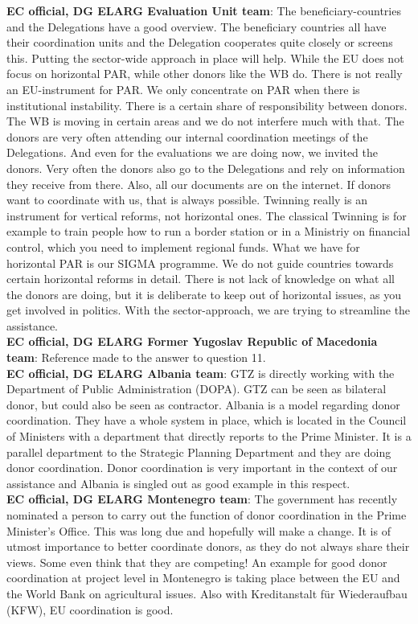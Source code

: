 \textbf{EC official, DG ELARG Evaluation Unit team}: The beneficiary-countries and the Delegations have a good overview. The beneficiary countries all have their coordination units and the Delegation cooperates quite closely or screens this. Putting the sector-wide approach in place will help. While the EU does not focus on horizontal PAR, while other donors like the WB do. There is not really an EU-instrument for PAR. We only concentrate on PAR when there is institutional instability. There is a certain share of responsibility between donors. The WB is moving in certain areas and we do not interfere much with that. The donors are very often attending our internal coordination meetings of the Delegations. And even for the evaluations we are doing now, we invited the donors. Very often the donors also go to the Delegations and rely on information they receive from there. Also, all our documents are on the internet. If donors want to coordinate with us, that is always possible. Twinning really is an instrument for vertical reforms, not horizontal ones. The classical Twinning is for example to train people how to run a border station or in a Ministriy on financial control, which you need to implement regional funds. What we have for horizontal PAR is our SIGMA programme. We do not guide countries towards certain horizontal reforms in detail. There is not lack of knowledge on what all the donors are doing, but it is deliberate to keep out of horizontal issues, as you get involved in politics. With the sector-approach, we are trying to streamline the assistance.\\ 
\textbf{EC official, DG ELARG Former Yugoslav Republic of  Macedonia team}: Reference made to the answer to question 11.\\
\textbf{EC official, DG ELARG Albania team}: GTZ is directly working with the Department of Public Administration (DOPA). GTZ can be seen as bilateral donor, but could also be seen as contractor. Albania is a model regarding donor coordination. They have a whole system in place, which is located in the Council of Ministers with a department that directly reports to the Prime Minister. It is a parallel department to the Strategic Planning Department and they are doing donor coordination. Donor coordination is very important in the context of our assistance and Albania is singled out as good example in this respect.\\
\textbf{EC official, DG ELARG Montenegro team}: The government has recently nominated a person to carry out the function of donor coordination in the Prime Minister's Office. This was long due and hopefully will make a change. It is of utmost importance to better coordinate donors, as they do not always share their views. Some even think that they are competing! An example for good donor coordination at project level in Montenegro is taking place between the EU and the World Bank on agricultural issues. Also with Kreditanstalt für Wiederaufbau (KFW), EU coordination is good.\\

